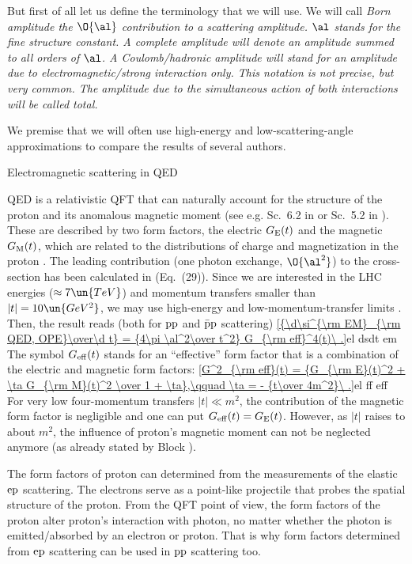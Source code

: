 But first of all let us define the terminology that we will use. We will call \em{Born amplitude} the $\O{\al}$ contribution to a scattering amplitude. $\al$ stands for the fine structure constant. A \em{complete} amplitude will denote an amplitude summed to all orders of $\al$. A \em{Coulomb}/\em{hadronic} amplitude will stand for an amplitude due to electromagnetic/strong interaction only. This notation is not precise, but very common. The amplitude due to the simultaneous action of both interactions will be called \em{total}.

We premise that we will often use high-energy and low-scattering-angle approximations to compare the results of several authors.

\caption{Electromagnetic scattering in QED}

QED is a relativistic QFT that can naturally account for the structure of the proton and its anomalous magnetic moment (see e.g. Sc.~6.2 in  or Sc.~5.2 in ). These are described by two form factors, the electric $G_{\rm E}(t)$ and the magnetic $G_{\rm M}(t)$, which are related to the distributions of charge and magnetization in the proton . The leading contribution (one photon exchange, $\O{\al^2}$) to the cross-section has been calculated in  (Eq.~(29)). Since we are interested in the LHC energies ($\approx 7\un{TeV}$) and momentum transfers smaller than $|t| = 10\un{GeV^2}$, we may use high-energy and low-momentum-transfer limits . Then, the result reads (both for $\rm pp$ and $\rm \bar p p$ scattering)
\eqref{{\d\si^{\rm EM}_{\rm QED, OPE}\over\d t} = {4\pi \al^2\over t^2} G_{\rm eff}^4(t)\ .}{el dsdt em}
The symbol $G_{\rm eff}(t)$ stands for an ``effective'' form factor that is a combination of the electric and magnetic form factors:
\eqref{G^2_{\rm eff}(t) = {G_{\rm E}(t)^2 + \ta G_{\rm M}(t)^2 \over 1 + \ta},\qquad \ta = - {t\over 4m^2}\ .}{el ff eff}
For very low four-momentum transfers $|t| \ll m^2$, the contribution of the magnetic form factor is negligible and one can put $G_{\rm eff}(t) = G_{\rm E}(t)$. However, as $|t|$ raises to about $m^2$, the influence of proton's magnetic moment can not be neglected anymore (as already stated by Block ).

The form factors of proton can determined from the measurements of the elastic $\rm ep$ scattering. The electrons serve as a point-like projectile that probes the spatial structure of the proton. From the QFT point of view, the form factors of the proton alter proton's interaction with photon, no matter whether the photon is emitted/absorbed by an electron or proton. That is why form factors determined from $\rm ep$ scattering can be used in $\rm pp$ scattering too.

